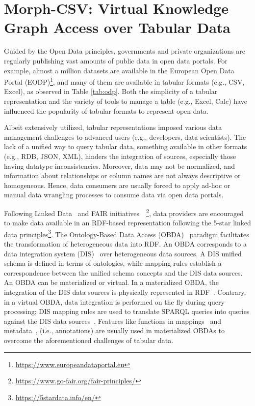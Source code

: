 \section{Morph-CSV: Virtual Knowledge Graph Access over Tabular Data}

Guided by the Open Data principles, governments and private organizations are regularly publishing vast amounts of public data in open data portals. For example, almost a million datasets are available in the European Open Data Portal (EODP)\footnote{\url{https://www.europeandataportal.eu}}, and many of them are available in tabular formats (e.g., CSV, Excel), as observed in Table \ref{tab:odp}. Both the simplicity of a tabular representation and the variety of tools to manage a table (e.g., Excel, Calc) have influenced the popularity of tabular formats to represent open data.  

Albeit extensively utilized, tabular representations imposed various data management challenges to advanced users (e.g., developers, data scientists). The lack of a unified way to query tabular data, something available in other formats (e.g., RDB, JSON, XML), hinders the integration of sources, especially those having datatype inconsistencies. Moreover, data may not be normalized, and information about relationships or column names are not always descriptive or homogeneous. Hence, data consumers are usually forced to apply ad-hoc or manual data wrangling processes to consume data via open data portals. 

Following Linked Data~\citep{bizer2011linked} and FAIR initiatives~\citep{wilkinson2016fair}~\footnote{\url{https://www.go-fair.org/fair-principles/}}, data providers are encouraged to make data available in an RDF-based representation following the 5-star linked data principles\footnote{\url{https://5stardata.info/en/}}. The Ontology-Based Data Access (OBDA)~\citep{poggi2008linking} paradigm facilitates the transformation of heterogeneous data into RDF.
An OBDA corresponds to a data integration system (DIS)~\citep{Lenzerini02} over heterogeneous data sources. A DIS unified schema is defined in terms of ontologies, while mapping rules establish a correspondence between the unified schema concepts and the DIS data sources. An OBDA can be materialized or virtual. In a materialized OBDA, the integration of the DIS data sources is physically represented in RDF~\citep{poggi2008linking}. Contrary, in a virtual OBDA, data integration is performed on the fly during query processing; DIS mapping rules are used to translate SPARQL queries into queries against the DIS data sources~\citep{calvanese2017ontop,priyatna2014formalisation}.
Features like functions in mappings~\citep{de2017declarative,junior2016funul} and metadata~\citep{tennison2015model}, (i.e., annotations) are usually used in materialized OBDAs to overcome the aforementioned challenges of tabular data.

